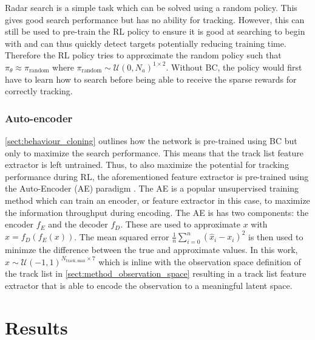 Radar search is a simple task which can be solved using a random policy. This gives good search performance but has no ability for tracking. However, this can still be used to pre-train the RL policy to ensure it is good at searching to begin with and can thus quickly detect targets potentially reducing training time. Therefore the RL policy tries to approximate the random policy such that $\pi_\theta \approx \pi_\mathrm{random}$ where $\pi_\mathrm{random} \sim \mathcal{U}(0,N_a)^{1 \times 2}$.
Without BC, the policy would first have to learn how to search before being able to receive the sparse rewards for correctly tracking. 

\subsubsection{Auto-encoder}
\label{sect:auto-encoder}
\autoref{sect:behaviour_cloning} outlines how the network is pre-trained using BC but only to maximize the search performance. This means that the track list feature extractor is left untrained. Thus, to also maximize the potential for tracking performance during RL, the aforementioned feature extractor is pre-trained using the Auto-Encoder (AE) paradigm \cite{Sarankumar2024}. The AE is a popular unsupervised training method which can train an encoder, or feature extractor in this case, to maximize the information throughput during encoding. The AE is has two components: the encoder $f_E$ and the decoder $f_D$. These are used to approximate $x$ with $\hat x = f_D(f_E(x))$. The mean squared error $\frac{1}{n} \sum^n_{i=0} (\hat x_i - x_i)^2$ is then used to minimze the difference between the true and approximate values. 
In this work, $x \sim \mathcal{U}(-1,1)^{N_\mathrm{track,max}\times7}$ which is inline with the observation space definition of the track list in \autoref{sect:method_observation_space} resulting in a track list feature extractor that is able to encode the observation to a meaningful latent space.

\section{Results}
\label{sect:results}


